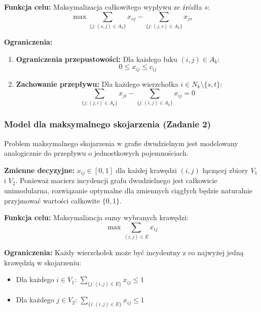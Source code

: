 \documentclass[11pt, a4paper]{article}
\begin{document}
	\textbf{Funkcja celu:} Maksymalizacja całkowitego wypływu ze źródła $s$:
	\begin{equation}
		\max \sum_{\{j:(s,j) \in A_k\}} x_{sj} - \sum_{\{j:(j,s) \in A_k\}} x_{js}
	\end{equation}
	
	\textbf{Ograniczenia:}
	\begin{enumerate}
		\item \textbf{Ograniczenia przepustowości:} Dla każdego łuku $(i,j) \in A_k$:
		\begin{equation}
			0 \le x_{ij} \le c_{ij}
		\end{equation}
		\item \textbf{Zachowanie przepływu:} Dla każdego wierzchołka $i \in N_k \setminus \{s, t\}$:
		\begin{equation}
			\sum_{\{j:(j,i) \in A_k\}} x_{ji} - \sum_{\{j:(i,j) \in A_k\}} x_{ij} = 0
		\end{equation}
	\end{enumerate}
	
	\subsubsection{Model dla maksymalnego skojarzenia (Zadanie 2)}
	Problem maksymalnego skojarzenia w grafie dwudzielnym jest modelowany analogicznie do przepływu o jednostkowych pojemnościach.
	
	\textbf{Zmienne decyzyjne:} $x_{ij} \in [0, 1]$ dla każdej krawędzi $(i, j)$ łączącej zbiory $V_1$ i $V_2$. Ponieważ macierz incydencji grafu dwudzielnego jest całkowicie unimodularna, rozwiązanie optymalne dla zmiennych ciągłych będzie naturalnie przyjmować wartości całkowite $\{0, 1\}$.
	
	\textbf{Funkcja celu:} Maksymalizacja sumy wybranych krawędzi:
	\begin{equation}
		\max \sum_{(i,j) \in E} x_{ij}
	\end{equation}
	
	\textbf{Ograniczenia:} Każdy wierzchołek może być incydentny z co najwyżej jedną krawędzią w skojarzeniu:
	\begin{itemize}
		\item Dla każdego $i \in V_1$: $\sum_{\{j:(i,j) \in E\}} x_{ij} \le 1$
		\item Dla każdego $j \in V_2$: $\sum_{\{i:(i,j) \in E\}} x_{ij} \le 1$
	\end{itemize}
	
\end{document}
